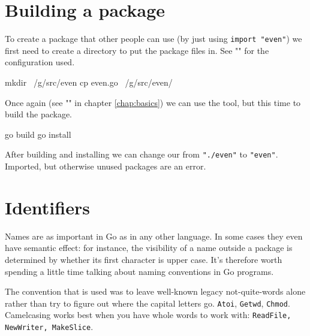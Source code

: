 \section{Building a package}
\label{sec:building a package}
To create a package that other people can use (by just using
\lstinline{import "even"}) we first need to create a directory
to put the package files in. See "" for
the configuration used.
\begin{display}
\pr mkdir ~/g/src/even
\pr cp even.go ~/g/src/even/
\end{display}
Once again (see "" in chapter \ref{chap:basics}) we can use 
the  tool, but this time to build the package.
\begin{display}
\pr go build
\pr go install
\end{display}

\noindent{}After building and installing we can change our  from
\lstinline{"./even"} to \lstinline{"even"}.
\noindent{}Imported, but otherwise unused packages are an error.

\section{Identifiers}
Names are as important in Go as in any other language. In some cases
they even have semantic effect: for instance, the visibility of a name
outside a package is determined by whether its first character is upper
case. It's therefore worth spending a little time talking about naming
conventions in Go programs.

The convention that is used was to leave well-known legacy
not-quite-words alone rather than try to figure out where
the capital letters go.  \lstinline{Atoi}, \lstinline{Getwd},
\lstinline{Chmod}.
Camelcasing works best when you have whole words
to work with: \lstinline{ReadFile, NewWriter, MakeSlice}.

